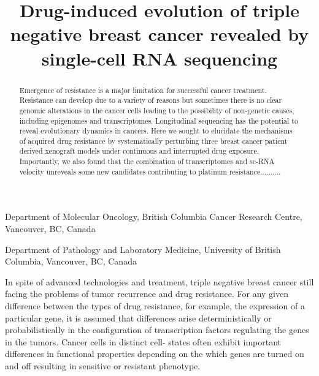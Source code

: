 \documentclass{nature}
\title{Drug-induced evolution of triple negative breast cancer revealed by single-cell RNA sequencing}
\author{Farhia Kabeer*$^{1,2}$, Hoa Tran*$^{1,2}$, Mirela Andronescu*$^{1,2}$,
   Nicholas Ceglia$^{1,2}$, 
   Hakwoo Lee$^{1,2}$, 
   Sohrab Salehi$^{1,2}$,
	Marc Williams$^{1,2}$
	Beixi Wang$^{1,2}$
	Justina Biele$^{1,2}$
	Jazmine Brimhall$^{1,2}$
	David Gee$^{1,2}$
	Ciara O’Flanagan$^{1,2}$,
	Teresa Ruiz de Algara$^{1,2}$,
	Peter Eirew$^{1,2}$,
	Takako Kono$^{1,2}$,
	Jennifer Pham$^{1,2}$,
	Daniel Lai$^{1,2}$,
	Richard Moore$^{1,2}$,
	Andrew J. Mungall$^{1,2}$,
	Marco A. Marra$^{1,2}$,
	IMAXT Consortium$^{1,2}$,
	Andrew McPherson$^{1,2}$,
	Andrew Roth$^{\dagger}$^{1,2}$,
	Kieran R. Campbell{\dagger}$^{1,2}$
	Sohrab P Shah$^{\dagger}$^{1,2}$,
    Samuel Aparicio$^{\dagger}$^{1,2}$}
\begin{document}
  \maketitle
\begin{affiliations}
 \item Department of Molecular Oncology, British Columbia Cancer Research Centre, Vancouver, BC, Canada
 \item Department of Pathology and Laboratory Medicine, University of British Columbia, Vancouver, BC, Canada 
\end{affiliations}

\newline

\begin{abstract}
Emergence of resistance is a major limitation for successful cancer treatment. Resistance can develop due to a variety of reasons but sometimes there is no clear genomic alterations in the cancer cells leading to the possibility of non-genetic causes, including epigenomes and transcriptomes. Longitudinal sequencing has the potential to reveal evolutionary dynamics in cancers. Here we sought to elucidate the mechanisms of acquired drug resistance by systematically perturbing three breast cancer patient derived xenograft models under continuous and interrupted drug exposure. Importantly, we also found that the combination of transcriptomes and sc-RNA velocity unreveals some new  candidates contributing to platinum resistance..........
 
 
\end{abstract}

In spite of advanced technologies and treatment, triple negative breast cancer still facing the problems of tumor recurrence and drug resistance.
For any given difference between the types of drug resistance, for example, the expression of a particular gene, it is assumed that differences arise deterministically or probabilistically in the configuration of transcription factors regulating the genes in the tumors. Cancer cells in distinct cell- states often exhibit important differences in functional properties depending on the which genes are turned on and off resulting in sensitive or resistant phenotype.
\end{document}
